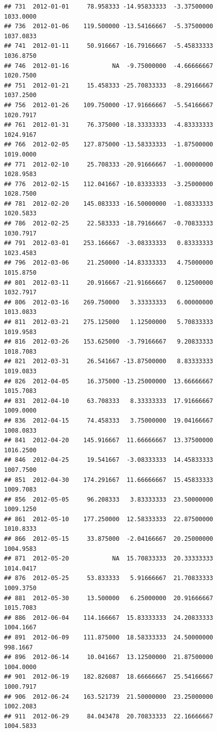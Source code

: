 \documentclass[
]{article}
\begin{document}
\begin{verbatim}
## 731  2012-01-01     78.958333 -14.95833333  -3.37500000    1033.0000
## 736  2012-01-06    119.500000 -13.54166667  -5.37500000    1037.0833
## 741  2012-01-11     50.916667 -16.79166667  -5.45833333    1036.8750
## 746  2012-01-16            NA  -9.75000000  -4.66666667    1020.7500
## 751  2012-01-21     15.458333 -25.70833333  -8.29166667    1037.2500
## 756  2012-01-26    109.750000 -17.91666667  -5.54166667    1020.7917
## 761  2012-01-31     76.375000 -18.33333333  -4.83333333    1024.9167
## 766  2012-02-05    127.875000 -13.58333333  -1.87500000    1019.0000
## 771  2012-02-10     25.708333 -20.91666667  -1.00000000    1028.9583
## 776  2012-02-15    112.041667 -10.83333333  -3.25000000    1028.7500
## 781  2012-02-20    145.083333 -16.50000000  -1.08333333    1020.5833
## 786  2012-02-25     22.583333 -18.79166667  -0.70833333    1030.7917
## 791  2012-03-01    253.166667  -3.08333333   0.83333333    1023.4583
## 796  2012-03-06     21.250000 -14.83333333   4.75000000    1015.8750
## 801  2012-03-11     20.916667 -21.91666667   0.12500000    1032.7917
## 806  2012-03-16    269.750000   3.33333333   6.00000000    1013.0833
## 811  2012-03-21    275.125000   1.12500000   5.70833333    1019.9583
## 816  2012-03-26    153.625000  -3.79166667   9.20833333    1018.7083
## 821  2012-03-31     26.541667 -13.87500000   8.83333333    1019.0833
## 826  2012-04-05     16.375000 -13.25000000  13.66666667    1015.7083
## 831  2012-04-10     63.708333   8.33333333  17.91666667    1009.0000
## 836  2012-04-15     74.458333   3.75000000  19.04166667    1008.0833
## 841  2012-04-20    145.916667  11.66666667  13.37500000    1016.2500
## 846  2012-04-25     19.541667  -3.08333333  14.45833333    1007.7500
## 851  2012-04-30    174.291667  11.66666667  15.45833333    1009.7083
## 856  2012-05-05     96.208333   3.83333333  23.50000000    1009.1250
## 861  2012-05-10    177.250000  12.58333333  22.87500000    1010.8333
## 866  2012-05-15     33.875000  -2.04166667  20.25000000    1004.9583
## 871  2012-05-20            NA  15.70833333  20.33333333    1014.0417
## 876  2012-05-25     53.833333   5.91666667  21.70833333    1009.3750
## 881  2012-05-30     13.500000   6.25000000  20.91666667    1015.7083
## 886  2012-06-04    114.166667  15.83333333  24.20833333    1004.1667
## 891  2012-06-09    111.875000  18.58333333  24.50000000     998.1667
## 896  2012-06-14     10.041667  13.12500000  21.87500000    1004.0000
## 901  2012-06-19    182.826087  18.66666667  25.54166667    1000.7917
## 906  2012-06-24    163.521739  21.50000000  23.25000000    1002.2083
## 911  2012-06-29     84.043478  20.70833333  22.16666667    1004.5833

\end{verbatim}
\end{document}
